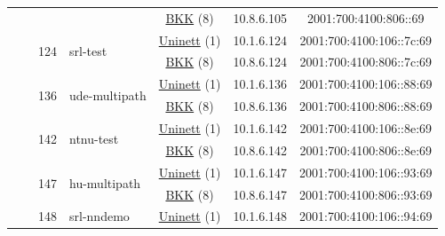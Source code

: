 \begin{small}
\begin{center}
\begin{longtable}{|c|c|c|c|c|c|c|c|}
  &  & \multicolumn{2}{|c|}{} & \multicolumn{2}{|c|}{\tiny{\href{http://bkk.no}{BKK} (8)}} & \tiny{10.8.6.105} & \tiny{2001:700:4100:806::69} \\* \cline{3-3}\cline{4-4}\cline{5-5}\cline{6-6}\cline{7-7}\cline{8-8}
  &  & \multirow{2}{*}{\tiny{124}} & \multicolumn{1}{|l|}{\multirow{2}{*}{\tiny{srl-test}}} & \multicolumn{2}{|c|}{\tiny{\href{https://www.uninett.no}{Uninett} (1)}} & \tiny{10.1.6.124} & \tiny{2001:700:4100:106::7c:69} \\* \cline{5-5}\cline{6-6}\cline{7-7}\cline{8-8}
  &  &  &  & \multicolumn{2}{|c|}{\tiny{\href{http://bkk.no}{BKK} (8)}} & \tiny{10.8.6.124} & \tiny{2001:700:4100:806::7c:69} \\* \cline{3-3}\cline{4-4}\cline{5-5}\cline{6-6}\cline{7-7}\cline{8-8}
  &  & \multirow{2}{*}{\tiny{136}} & \multicolumn{1}{|l|}{\multirow{2}{*}{\tiny{ude-multipath}}} & \multicolumn{2}{|c|}{\tiny{\href{https://www.uninett.no}{Uninett} (1)}} & \tiny{10.1.6.136} & \tiny{2001:700:4100:106::88:69} \\* \cline{5-5}\cline{6-6}\cline{7-7}\cline{8-8}
  &  &  &  & \multicolumn{2}{|c|}{\tiny{\href{http://bkk.no}{BKK} (8)}} & \tiny{10.8.6.136} & \tiny{2001:700:4100:806::88:69} \\* \cline{3-3}\cline{4-4}\cline{5-5}\cline{6-6}\cline{7-7}\cline{8-8}
  &  & \multirow{2}{*}{\tiny{142}} & \multicolumn{1}{|l|}{\multirow{2}{*}{\tiny{ntnu-test}}} & \multicolumn{2}{|c|}{\tiny{\href{https://www.uninett.no}{Uninett} (1)}} & \tiny{10.1.6.142} & \tiny{2001:700:4100:106::8e:69} \\* \cline{5-5}\cline{6-6}\cline{7-7}\cline{8-8}
  &  &  &  & \multicolumn{2}{|c|}{\tiny{\href{http://bkk.no}{BKK} (8)}} & \tiny{10.8.6.142} & \tiny{2001:700:4100:806::8e:69} \\* \cline{3-3}\cline{4-4}\cline{5-5}\cline{6-6}\cline{7-7}\cline{8-8}
  &  & \multirow{2}{*}{\tiny{147}} & \multicolumn{1}{|l|}{\multirow{2}{*}{\tiny{hu-multipath}}} & \multicolumn{2}{|c|}{\tiny{\href{https://www.uninett.no}{Uninett} (1)}} & \tiny{10.1.6.147} & \tiny{2001:700:4100:106::93:69} \\* \cline{5-5}\cline{6-6}\cline{7-7}\cline{8-8}
  &  &  &  & \multicolumn{2}{|c|}{\tiny{\href{http://bkk.no}{BKK} (8)}} & \tiny{10.8.6.147} & \tiny{2001:700:4100:806::93:69} \\* \cline{3-3}\cline{4-4}\cline{5-5}\cline{6-6}\cline{7-7}\cline{8-8}
  &  & \multirow{2}{*}{\tiny{148}} & \multicolumn{1}{|l|}{\multirow{2}{*}{\tiny{srl-nndemo}}} & \multicolumn{2}{|c|}{\tiny{\href{https://www.uninett.no}{Uninett} (1)}} & \tiny{10.1.6.148} & \tiny{2001:700:4100:106::94:69} \\* \cline{5-5}\cline{6-6}\cline{7-7}\cline{8-8}

\end{longtable}
\end{center}
\end{small}
